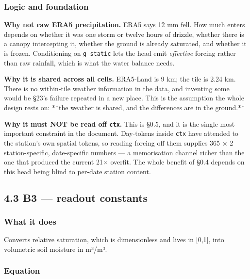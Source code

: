\documentclass[10pt,a4paper]{article}
\begin{document}
\subsubsection*{Logic and foundation}

\textbf{Why not raw ERA5 precipitation.} ERA5 says 12 mm fell. How much enters
depends on whether it was one storm or twelve hours of drizzle, whether there is
a canopy intercepting it, whether the ground is already saturated, and whether
it is frozen. Conditioning on \texttt{g\_static} lets the head emit \emph{effective} forcing
rather than raw rainfall, which is what the water balance needs.

\textbf{Why it is shared across all cells.} ERA5-Land is 9 km; the tile is 2.24 km.
There is no within-tile weather information in the data, and inventing some
would be §23's failure repeated in a new place. This is the assumption the whole
design rests on: **the weather is shared, and the differences are in the
ground.**

\textbf{Why it must NOT be read off \texttt{ctx}.} This is §0.5, and it is the single most
important constraint in the document. Day-tokens inside \texttt{ctx} have attended to
the station's own spatial tokens, so reading forcing off them supplies
365 × 2 station-specific, date-specific numbers — a memorisation channel richer
than the one that produced the current 21× overfit. The whole benefit of §0.4
depends on this head being blind to per-date station content.

\subsection*{4.3 B3 — readout constants}

\subsubsection*{What it does}

Converts relative saturation, which is dimensionless and lives in [0,1], into
volumetric soil moisture in m³/m³.

\subsubsection*{Equation}
\end{document}
